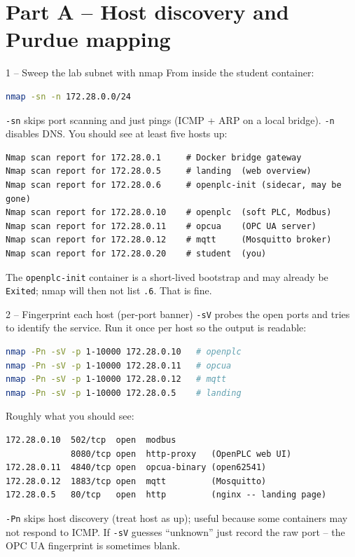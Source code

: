 \documentclass[11pt,a4paper]{article}
\begin{document}
\section*{Part A -- Host discovery and Purdue mapping}

\begin{stepbox}{1 -- Sweep the lab subnet with nmap}
From inside the student container:
\begin{lstlisting}[language=bash]
nmap -sn -n 172.28.0.0/24
\end{lstlisting}

\texttt{-sn} skips port scanning and just pings (ICMP + ARP on a local
bridge). \texttt{-n} disables DNS. You should see at least five hosts up:

\begin{lstlisting}
Nmap scan report for 172.28.0.1     # Docker bridge gateway
Nmap scan report for 172.28.0.5     # landing  (web overview)
Nmap scan report for 172.28.0.6     # openplc-init (sidecar, may be gone)
Nmap scan report for 172.28.0.10    # openplc  (soft PLC, Modbus)
Nmap scan report for 172.28.0.11    # opcua    (OPC UA server)
Nmap scan report for 172.28.0.12    # mqtt     (Mosquitto broker)
Nmap scan report for 172.28.0.20    # student  (you)
\end{lstlisting}

The \texttt{openplc-init} container is a short-lived bootstrap and may
already be \texttt{Exited}; nmap will then not list \texttt{.6}. That is
fine.
\end{stepbox}

\begin{stepbox}{2 -- Fingerprint each host (per-port banner)}
\texttt{-sV} probes the open ports and tries to identify the service. Run
it once per host so the output is readable:
\begin{lstlisting}[language=bash]
nmap -Pn -sV -p 1-10000 172.28.0.10   # openplc
nmap -Pn -sV -p 1-10000 172.28.0.11   # opcua
nmap -Pn -sV -p 1-10000 172.28.0.12   # mqtt
nmap -Pn -sV -p 1-10000 172.28.0.5    # landing
\end{lstlisting}

Roughly what you should see:

\begin{lstlisting}
172.28.0.10  502/tcp  open  modbus
             8080/tcp open  http-proxy   (OpenPLC web UI)
172.28.0.11  4840/tcp open  opcua-binary (open62541)
172.28.0.12  1883/tcp open  mqtt         (Mosquitto)
172.28.0.5   80/tcp   open  http         (nginx -- landing page)
\end{lstlisting}

\texttt{-Pn} skips host discovery (treat host as up); useful because some
containers may not respond to ICMP. If \texttt{-sV} guesses ``unknown''
just record the raw port -- the OPC UA fingerprint is sometimes blank.
\end{stepbox}
\end{document}
